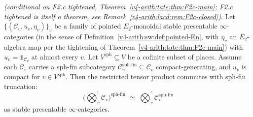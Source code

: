 \begin{theorem}
\label{v4-arith:lacd:thm:L1-closed}
\ClaimStatusProvedHereConditional \emph{(conditional on F2.c tightened,
Theorem~\ref{v4-arith:tate:thm:F2c-main}; F2.c tightened is itself a theorem,
see Remark~\ref{v4-arith:lacd:rem:F2c-closed})}. Let
\(\{(\mathcal{C}_{v}, u_{v}, \eta_{v})\}_{v}\) be a family of pointed
\(E_{2}\)-monoidal stable presentable \(\infty\)-categories (in the
sense of Definition~\ref{v4-arith:sw:def:pointed-En}, with \(\eta_{v}\) an
\(E_{2}\)-algebra map per the tightening of
Theorem~\ref{v4-arith:tate:thm:F2c-main})
with \(u_{v} = \mathbb{1}_{\mathcal{C}_{v}}\) at almost every \(v\). Let
\(V^{\mathrm{sph}} \subseteq V\) be a cofinite subset of places.
Assume each \(\mathcal{C}_{v}\) carries a sph-fin subcategory
\(\mathcal{C}_{v}^{\mathrm{sph\text{-}fin}} \subseteq \mathcal{C}_{v}\)
compact-generating, and \(u_{v}\) is compact for \(v \in V^{\mathrm{sph}}\).
Then the restricted tensor product commutes with sph-fin truncation:
\begin{equation}
\label{v4-arith:lacd:eq:colim-commutes}
\bigl(\bigotimes_{v}^{\prime}\mathcal{C}_{v}\bigr)^{\mathrm{sph\text{-}fin}}
\;\simeq\;
\bigotimes_{v}^{\prime}\mathcal{C}_{v}^{\mathrm{sph\text{-}fin}}
\end{equation}
as stable presentable \(\infty\)-categories.
\end{theorem}

